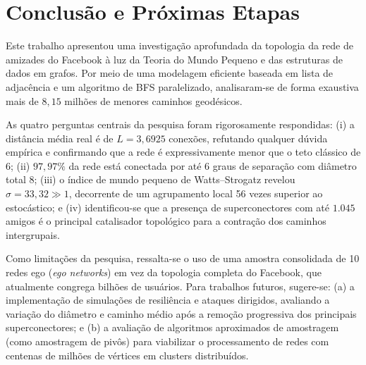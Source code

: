 \documentclass[conference]{IEEEtran}
\begin{document}
\section{Conclusão e Próximas Etapas}
\label{sec:conclusao}

Este trabalho apresentou uma investigação aprofundada da topologia da rede de amizades do Facebook à luz da Teoria do Mundo Pequeno e das estruturas de dados em grafos. Por meio de uma modelagem eficiente baseada em lista de adjacência e um algoritmo de BFS paralelizado, analisaram-se de forma exaustiva mais de $8,15$ milhões de menores caminhos geodésicos.

As quatro perguntas centrais da pesquisa foram rigorosamente respondidas: (i) a distância média real é de $L = 3,6925$ conexões, refutando qualquer dúvida empírica e confirmando que a rede é expressivamente menor que o teto clássico de 6; (ii) $97,97\%$ da rede está conectada por até 6 graus de separação com diâmetro total 8; (iii) o índice de mundo pequeno de Watts--Strogatz revelou $\sigma = 33,32 \gg 1$, decorrente de um agrupamento local 56 vezes superior ao estocástico; e (iv) identificou-se que a presença de superconectores com até $1.045$ amigos é o principal catalisador topológico para a contração dos caminhos intergrupais.

Como limitações da pesquisa, ressalta-se o uso de uma amostra consolidada de 10 redes ego (\textit{ego networks}) em vez da topologia completa do Facebook, que atualmente congrega bilhões de usuários. Para trabalhos futuros, sugere-se: (a) a implementação de simulações de resiliência e ataques dirigidos, avaliando a variação do diâmetro e caminho médio após a remoção progressiva dos principais superconectores; e (b) a avaliação de algoritmos aproximados de amostragem (como amostragem de pivôs) para viabilizar o processamento de redes com centenas de milhões de vértices em clusters distribuídos.



\end{document}
